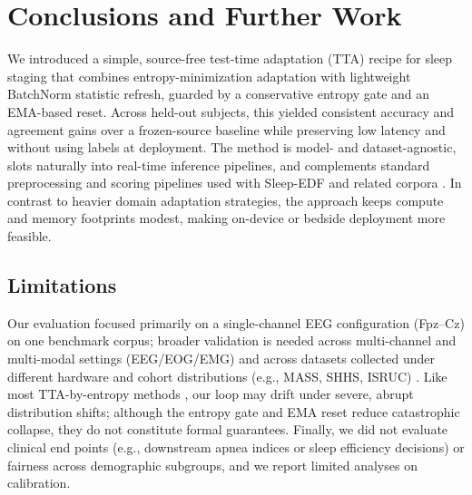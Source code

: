 \documentclass{article}
\begin{document}
\section{Conclusions and Further Work}
We introduced a simple, source-free test-time adaptation (TTA) recipe for sleep staging that combines entropy-minimization adaptation with lightweight BatchNorm statistic refresh, guarded by a conservative entropy gate and an EMA-based reset. Across held-out subjects, this yielded consistent accuracy and agreement gains over a frozen-source baseline while preserving low latency and without using labels at deployment. The method is model- and dataset-agnostic, slots naturally into real-time inference pipelines, and complements standard preprocessing and scoring pipelines used with Sleep-EDF and related corpora \citep{goldberger2000physionet,berry2012aasm,gramfort2013mne}. In contrast to heavier domain adaptation strategies, the approach keeps compute and memory footprints modest, making on-device or bedside deployment more feasible.

\subsection{Limitations}
Our evaluation focused primarily on a single-channel EEG configuration (Fpz–Cz) on one benchmark corpus; broader validation is needed across multi-channel and multi-modal settings (EEG/EOG/EMG) and across datasets collected under different hardware and cohort distributions (e.g., MASS, SHHS, ISRUC) \citep{oreilly2014mass,quan1997shhs,khalighi2016isruc}. Like most TTA-by-entropy methods \citep{wang2021tent}, our loop may drift under severe, abrupt distribution shifts; although the entropy gate and EMA reset reduce catastrophic collapse, they do not constitute formal guarantees. Finally, we did not evaluate clinical end points (e.g., downstream apnea indices or sleep efficiency decisions) or fairness across demographic subgroups, and we report limited analyses on calibration.
\end{document}
